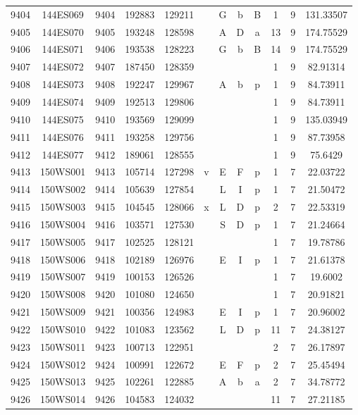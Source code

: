 \begin{tabular}{|*{12}{c|}}
9404 & 144ES069 & 9404 & 192883 & 129211 &  & G & b & B & 1 & 9 & 131.33507 \\ 
9405 & 144ES070 & 9405 & 193248 & 128598 &  & A & D & a & 13 & 9 & 174.75529 \\ 
9406 & 144ES071 & 9406 & 193538 & 128223 &  & G & b & B & 14 & 9 & 174.75529 \\ 
9407 & 144ES072 & 9407 & 187450 & 128359 &  &  &  &  & 1 & 9 & 82.91314 \\ 
9408 & 144ES073 & 9408 & 192247 & 129967 &  & A & b & p & 1 & 9 & 84.73911 \\ 
9409 & 144ES074 & 9409 & 192513 & 129806 &  &  &  &  & 1 & 9 & 84.73911 \\ 
9410 & 144ES075 & 9410 & 193569 & 129099 &  &  &  &  & 1 & 9 & 135.03949 \\ 
9411 & 144ES076 & 9411 & 193258 & 129756 &  &  &  &  & 1 & 9 & 87.73958 \\ 
9412 & 144ES077 & 9412 & 189061 & 128555 &  &  &  &  & 1 & 9 & 75.6429 \\ 
9413 & 150WS001 & 9413 & 105714 & 127298 & v & E & F & p & 1 & 7 & 22.03722 \\ 
9414 & 150WS002 & 9414 & 105639 & 127854 &  & L & I & p & 1 & 7 & 21.50472 \\ 
9415 & 150WS003 & 9415 & 104545 & 128066 & x & L & D & p & 2 & 7 & 22.53319 \\ 
9416 & 150WS004 & 9416 & 103571 & 127530 &  & S & D & p & 1 & 7 & 21.24664 \\ 
9417 & 150WS005 & 9417 & 102525 & 128121 &  &  &  &  & 1 & 7 & 19.78786 \\ 
9418 & 150WS006 & 9418 & 102189 & 126976 &  & E & I & p & 1 & 7 & 21.61378 \\ 
9419 & 150WS007 & 9419 & 100153 & 126526 &  &  &  &  & 1 & 7 & 19.6002 \\ 
9420 & 150WS008 & 9420 & 101080 & 124650 &  &  &  &  & 1 & 7 & 20.91821 \\ 
9421 & 150WS009 & 9421 & 100356 & 124983 &  & E & I & p & 1 & 7 & 20.96002 \\ 
9422 & 150WS010 & 9422 & 101083 & 123562 &  & L & D & p & 11 & 7 & 24.38127 \\ 
9423 & 150WS011 & 9423 & 100713 & 122951 &  &  &  &  & 2 & 7 & 26.17897 \\ 
9424 & 150WS012 & 9424 & 100991 & 122672 &  & E & F & p & 2 & 7 & 25.45494 \\ 
9425 & 150WS013 & 9425 & 102261 & 122885 &  & A & b & a & 2 & 7 & 34.78772 \\ 
9426 & 150WS014 & 9426 & 104583 & 124032 &  &  &  &  & 11 & 7 & 27.21185 \\ 

\end{tabular}
